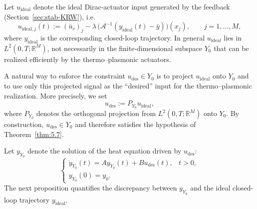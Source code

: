 \documentclass[11pt,a4paper]{article}
\numberwithin{equation}{section}
\theoremstyle{definition}
\newcommand{\1}{\mathbbm{1}}
\begin{document}
\begin{enumerate}
Let $u_{\mathrm{ideal}}$ denote the ideal Dirac-actuator input generated by the feedback
(Section~\ref{sec:stab-KRW}), i.e.
\[
  u_{\mathrm{ideal},j}(t)
  := (\bar u_r)_j-\lambda\,\big(\mathcal A^{-1}(y_{\mathrm{ideal}}(t)-\bar y)\big)(x_j),
  \qquad j=1,\dots,M,
\]
where $y_{\mathrm{ideal}}$ is the corresponding closed-loop trajectory.
In general $u_{\mathrm{ideal}}$ lies in $L^2(0,T;\mathbb{R}^M)$, not necessarily in the
finite-dimensional subspace $Y_0$ that can be realized efficiently by the thermo--plasmonic actuators.

A natural way to enforce the constraint $u_{\mathrm{des}}\in Y_0$ is to
project $u_{\mathrm{ideal}}$ onto $Y_0$ and to use only this projected signal
as the ``desired'' input for the thermo--plasmonic realization. More
precisely, we set
\begin{equation}
\label{eq:5.Y0-u-des}
  u_{\mathrm{des}} := P_{Y_0} u_{\mathrm{ideal}},
\end{equation}
where $P_{Y_0}$ denotes the orthogonal projection from
$L^2(0,T;\mathbb{R}^M)$ onto $Y_0$. By construction, $u_{\mathrm{des}}\in Y_0$
and therefore satisfies the hypothesis of Theorem~\ref{thm:5.7}.

Let $y_{Y_0}$ denote the solution of the heat equation driven by
$u_{\mathrm{des}}$:
\begin{equation}
\label{eq:5.Y0}
\begin{cases}
\dot y_{Y_0}(t) = A y_{Y_0}(t) + B u_{\mathrm{des}}(t), & t>0,\\[0.2em]
y_{Y_0}(0) = y_0.
\end{cases}
\end{equation}
The next proposition quantifies the discrepancy between $y_{Y_0}$ and the
ideal closed-loop trajectory $y_{\mathrm{ideal}}$.


\end{enumerate}
\end{document}
